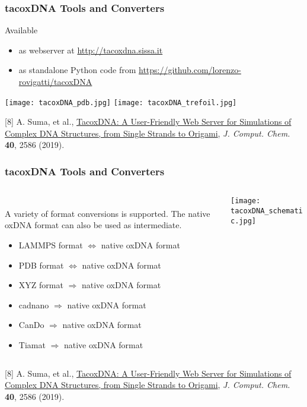 \documentclass[slidestop,compress,9pt]{beamer}
\begin{document}
\begin{frame}
\frametitle{tacoxDNA Tools and Converters}

Available
\begin{itemize}
\item as webserver at \href{http://tacoxdna.sissa.it}{http://tacoxdna.sissa.it}
\item as standalone Python code from \href{https://github.com/lorenzo-rovigatti/tacoxDNA}{https://github.com/lorenzo-rovigatti/tacoxDNA}
\end{itemize}

\vspace*{0.5cm}
\texttt{[image: tacoxDNA\_pdb.jpg]}
\texttt{[image: tacoxDNA\_trefoil.jpg]}\\
\vspace*{0.5cm}

[8] A. Suma, et al., \href{https://doi.org/10.1002/jcc.26029}{TacoxDNA: A User-Friendly Web Server for Simulations of Complex DNA Structures, from Single Strands to Origami}, \textit{J. Comput. Chem.} \textbf{40}, 2586 (2019).

\end{frame}
\begin{frame}

\frametitle{tacoxDNA Tools and Converters}

\begin{columns}
\begin{column}{0.55\textwidth}
\vspace*{0.25cm}\\
A variety of format conversions is supported. The native oxDNA format can also be used as intermediate.
\vspace*{0.25cm}
\begin{itemize}
\setlength\itemsep{7pt}
\item LAMMPS format $\Leftrightarrow$ native oxDNA format
\item PDB format $\Leftrightarrow$ native oxDNA format
\item XYZ format $\Rightarrow$ native oxDNA format
\item cadnano $\Rightarrow$ native oxDNA format
\item CanDo $\Rightarrow$ native oxDNA format
\item Tiamat $\Rightarrow$ native oxDNA format
\end{itemize}
\end{column}

\begin{column}{0.45\textwidth}
\begin{center}
\texttt{[image: tacoxDNA\_schematic.jpg]}
\end{center}
\end{column}
\end{columns}
\vspace*{0.25cm}
[8] A. Suma, et al., \href{https://doi.org/10.1002/jcc.26029}{TacoxDNA: A User-Friendly Web Server for Simulations of Complex DNA Structures, from Single Strands to Origami}, \textit{J. Comput. Chem.} \textbf{40}, 2586 (2019).

\end{frame}
\end{document}
